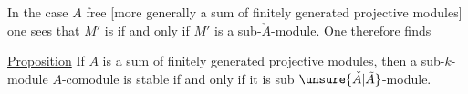In the case $A$ free [more generally a sum of finitely generated projective modules] one sees that $M'$ is  if and only if $M'$ is  a sub-$\check{A}$-module. One therefore finds

\uline{Proposition} If $A$ is a sum of finitely generated projective modules, then a sub-$k$-module  $A$-comodule is stable if and only if it is   sub $\unsure{\check{A}|\tilde{A}}$-module.
